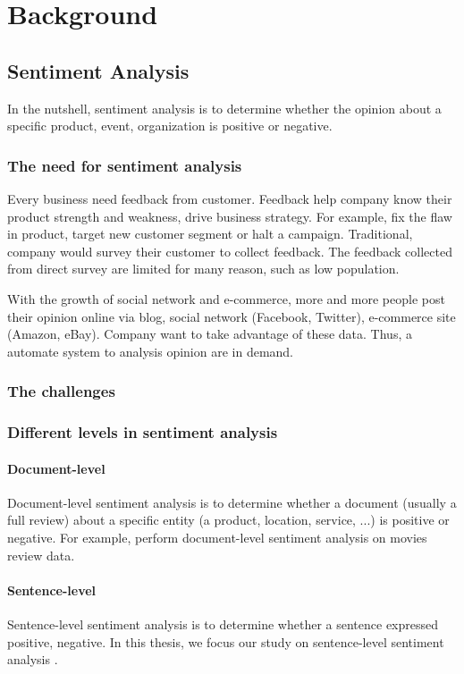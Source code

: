 \chapter{Background}\label{chap:background}

\section{Sentiment Analysis}
In the nutshell, sentiment analysis is to determine whether the opinion about a specific product, event, organization is positive or negative.
\subsection{The need for sentiment analysis}
Every business need feedback from customer. Feedback help company know their product strength and weakness, drive business strategy. For example, fix the flaw in product, target new customer segment or halt a campaign. Traditional, company would survey their customer to collect feedback.  The feedback collected from direct survey are limited for many reason, such as low population.

With the growth of social network and e-commerce, more and more people post their opinion online via blog, social network (Facebook, Twitter), e-commerce site (Amazon, eBay). Company want to take advantage of these data. Thus, a automate system to analysis opinion are in demand.

\subsection{The challenges}


\subsection{Different levels in sentiment analysis}
\subsubsection{Document-level}
Document-level sentiment analysis is to determine whether a document (usually a full review) about a specific entity (a product, location, service, ...) is positive or negative. For example, \cite{pang2002thumbs} perform document-level sentiment analysis on movies review data.
\subsubsection{Sentence-level}\label{sec:sent-level}
Sentence-level sentiment analysis is to determine whether a sentence expressed positive, negative. In this thesis, we focus our study on sentence-level sentiment analysis \cite{liu2012sentiment}.

